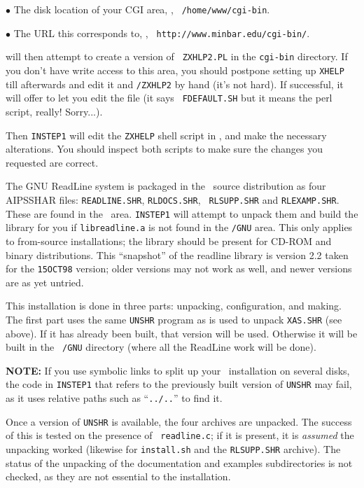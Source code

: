 \item{$\bullet$} The disk location of your CGI area, \eg, {\tt
  /home/www/cgi-bin}.
\item{$\bullet$} The URL this corresponds to, \eg, {\tt
  http://www.minbar.edu/cgi-bin/}.\medskip

 will then attempt to create a version of {\tt
ZXHLP2.PL} in the {\tt cgi-bin} directory.  If you don't have write
access to this area, you should postpone setting up {\tt XHELP} till
afterwards and edit it and {\tt \SYSU/ZXHLP2} by hand (it's not hard).
If successful, it will offer to let you edit the file (it says {\tt
FDEFAULT.SH} but it means the perl script, really!  Sorry...).

Then {\tt INSTEP1} will edit the {\tt ZXHELP} shell script in \SYSU, and
make the necessary alterations.  You should inspect both scripts to make
sure the changes you requested are correct.

\bigskip{}

The GNU ReadLine system is packaged in the \AIPS\ source distribution as
four AIPS\-SHAR files: {\tt READLINE.SHR}, {\tt RLDOCS.SHR}, {\tt
RLSUPP.SHR} and {\tt RLEXAMP.SHR}.  These are found in the \SYSU\ area.
{\tt INSTEP1} will attempt to unpack them and build the library for you
if {\tt libreadline.a} is not found in the {\tt\LIBR/GNU} area.  This
only applies to from-source installations; the library should be present
for CD-ROM and binary distributions.  This ``snapshot'' of the readline
library is version 2.2 taken for the {\tt 15OCT98} version;
older versions may not work as well, and newer versions are as yet
untried.

This installation is done in three parts: unpacking, configuration, and
making.  The first part uses the same {\tt UNSHR} program as is used to
unpack {\tt XAS.SHR} (see above).  If it has already been built, that
version will be used.  Otherwise it will be built in the {\tt
\LIBR/GNU} directory (where all the ReadLine work will be done).

{\bf NOTE:} If you use symbolic links to split up your
\AIPS\ installation on several disks, the code in {\tt INSTEP1} that
refers to the previously built version of {\tt UNSHR} may fail, as it
uses relative paths such as ``{\tt ../..}'' to find it.

Once a version of {\tt UNSHR} is available, the four archives are
unpacked.  The success of this is tested on the presence of {\tt
readline.c}; if it is present, it is {\it assumed} the unpacking worked
(likewise for {\tt install.sh} and the {\tt RLSUPP.SHR} archive).  The
status of the unpacking of the documentation and examples subdirectories
is not checked, as they are not essential to the installation.

